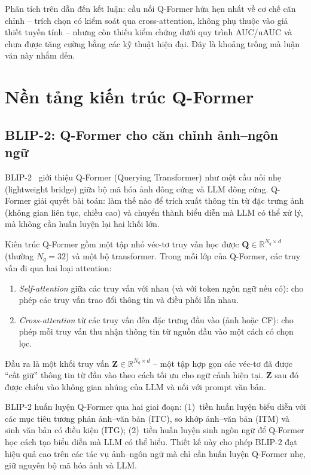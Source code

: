 Phân tích trên dẫn đến kết luận: cầu nối Q-Former hứa hẹn nhất về cơ chế căn chỉnh --
trích chọn có kiểm soát qua cross-attention, không phụ thuộc vào giả thiết tuyến tính --
nhưng còn thiếu kiểm chứng dưới quy trình AUC/uAUC và chưa được tăng cường bằng các kỹ
thuật hiện đại. Đây là khoảng trống mà luận văn này nhắm đến.

\section{Nền tảng kiến trúc Q-Former}
\label{sec:nen-tang-qformer}

\subsection{BLIP-2: Q-Former cho căn chỉnh ảnh--ngôn ngữ}
\label{ssec:blip2}

BLIP-2~\cite{blip2_2023} giới thiệu Q-Former (Querying Transformer) như một cầu nối nhẹ
(lightweight bridge) giữa bộ mã hóa ảnh đông cứng và LLM đông cứng. Q-Former giải quyết
bài toán: làm thế nào để trích xuất thông tin từ đặc trưng ảnh (không gian liên tục,
chiều cao) và chuyển thành biểu diễn mà LLM có thể xử lý, mà không cần huấn luyện lại
hai khối lớn.

Kiến trúc Q-Former gồm một tập nhỏ véc-tơ truy vấn học được $\mathbf{Q} \in
\mathbb{R}^{N_q \times d}$ (thường $N_q = 32$) và một bộ transformer. Trong mỗi lớp của
Q-Former, các truy vấn đi qua hai loại attention:

\begin{enumerate}
    \item \textit{Self-attention} giữa các truy vấn với nhau (và với token ngôn ngữ nếu
    có): cho phép các truy vấn trao đổi thông tin và điều phối lẫn nhau.

    \item \textit{Cross-attention} từ các truy vấn đến đặc trưng đầu vào (ảnh hoặc CF):
    cho phép mỗi truy vấn thu nhận thông tin từ nguồn đầu vào một cách có chọn lọc.
\end{enumerate}

Đầu ra là một khối truy vấn $\mathbf{Z} \in \mathbb{R}^{N_q \times d}$ -- một tập hợp
gọn các véc-tơ đã được ``cất giữ'' thông tin từ đầu vào theo cách tối ưu cho ngữ
cảnh hiện tại. $\mathbf{Z}$ sau đó được chiếu vào không gian nhúng của LLM và nối với
prompt văn bản.

BLIP-2 huấn luyện Q-Former qua hai giai đoạn: (1)~tiền huấn luyện biểu diễn với các mục
tiêu tương phản ảnh--văn bản (ITC), so khớp ảnh--văn bản (ITM) và sinh văn bản có điều
kiện (ITG); (2)~tiền huấn luyện sinh ngôn ngữ để Q-Former học cách tạo biểu diễn mà LLM
có thể hiểu. Thiết kế này cho phép BLIP-2 đạt hiệu quả cao trên các tác vụ ảnh--ngôn
ngữ mà chỉ cần huấn luyện Q-Former nhẹ, giữ nguyên bộ mã hóa ảnh và LLM.

